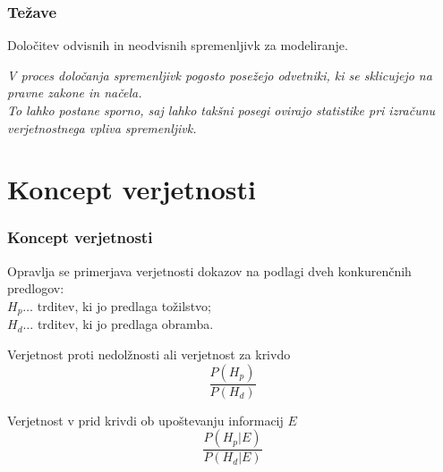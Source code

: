\documentclass{beamer}
\begin{document}
\begin{frame}
   \frametitle{Težave}
   \begin{block}{}
       \centering
       Določitev odvisnih in neodvisnih spremenljivk za modeliranje.
   \end{block}\vspace{3mm}
   \textit{
   V proces določanja spremenljivk pogosto posežejo odvetniki, ki se sklicujejo na pravne zakone in načela. \\
   To lahko postane sporno, saj lahko takšni posegi ovirajo statistike pri izračunu verjetnostnega vpliva spremenljivk.}
\end{frame}

\section{Koncept verjetnosti}

\begin{frame}
    \frametitle{Koncept verjetnosti}
    Opravlja se primerjava verjetnosti dokazov na podlagi dveh konkurenčnih predlogov:\\
    $H_p \dots$ trditev, ki jo predlaga tožilstvo;\\
    $H_d \dots$ trditev, ki jo predlaga obramba.\\ \vspace{5mm}
   \begin{beamerboxesrounded}[]{Verjetnost proti nedolžnosti ali verjetnost za krivdo}
      \[
          \frac{P(H_p)}{P(H_d)}
      \]    
  \end{beamerboxesrounded} \vspace{3mm}
  \begin{beamerboxesrounded}[]{Verjetnost v prid krivdi ob upoštevanju informacij $E$}
      \[
          \frac{P(H_p \lvert E)}{P(H_d \lvert E)} 
      \]    
  \end{beamerboxesrounded} \vspace{5mm}
\end{frame}
\end{document}
